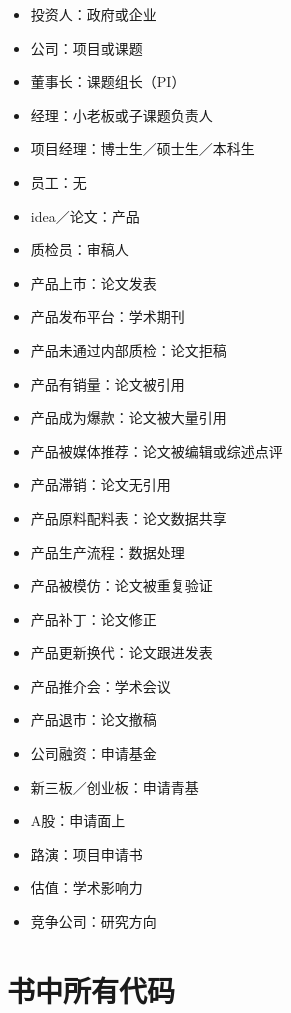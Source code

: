 \documentclass[]{tufte-book}
\providecommand{\tightlist}{%
  \setlength{\itemsep}{0pt}\setlength{\parskip}{0pt}}
\begin{document}
\begin{itemize}
\tightlist
\item
  投资人：政府或企业
\item
  公司：项目或课题
\item
  董事长：课题组长（PI）
\item
  经理：小老板或子课题负责人
\item
  项目经理：博士生／硕士生／本科生
\item
  员工：无
\item
  idea／论文：产品
\item
  质检员：审稿人
\item
  产品上市：论文发表
\item
  产品发布平台：学术期刊
\item
  产品未通过内部质检：论文拒稿
\item
  产品有销量：论文被引用
\item
  产品成为爆款：论文被大量引用
\item
  产品被媒体推荐：论文被编辑或综述点评
\item
  产品滞销：论文无引用
\item
  产品原料配料表：论文数据共享
\item
  产品生产流程：数据处理
\item
  产品被模仿：论文被重复验证
\item
  产品补丁：论文修正
\item
  产品更新换代：论文跟进发表
\item
  产品推介会：学术会议
\item
  产品退市：论文撤稿
\item
  公司融资：申请基金
\item
  新三板／创业板：申请青基
\item
  A股：申请面上
\item
  路演：项目申请书
\item
  估值：学术影响力
\item
  竞争公司：研究方向
\end{itemize}

\hypertarget{ux4e66ux4e2dux6240ux6709ux4ee3ux7801}{%
\section*{书中所有代码}\label{ux4e66ux4e2dux6240ux6709ux4ee3ux7801}}
\end{document}
